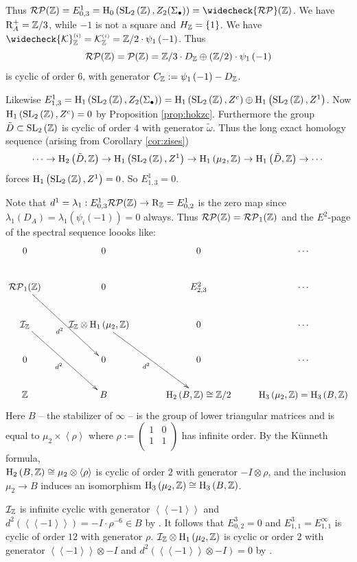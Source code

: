 \documentclass[12pt]{amsart}
\theoremstyle{definition}
\newcommand{\Z}{\Bbb{Z}}
\newcommand{\K}{\mathcal{K}}
\newcommand{\spl}[2]{\operatorname{SL}_{#1}\left(#2\right)}
\newcommand{\pb}[1]{\mathcal{P}(#1)}%
\newcommand{\rpb}[1]{\mathcal{RP}(#1)}%
\newcommand{\rpbker}[1]{\mathcal{RP}_1(#1)}%
\newcommand{\crpb}[1]{\widecheck{\mathcal{RP}}(#1)}
\newcommand{\suss}[2]{\psi_{#1}\left( #2\right)}
\newcommand{\ks}[2]{{\K}^{\mbox{\tiny $(#1)$}}_{#2}}
\newcommand{\cks}[2]{\widecheck{{\K}}^{\mbox{\tiny $(#1)$}}_{#2}}
\newcommand{\bconst}[1]{C_{#1}}
\newcommand{\cconst}[1]{D_{#1}}
\newcommand{\<}{\langle}
\renewcommand{\>}{\rangle}
\newcommand{\sgr}[1]{\mathrm{R}_{#1}}%
\newcommand{\qsgr}[1]{\mathrm{R}^{+}_{#1}} %
\newcommand{\an}[1]{\left\langle{#1}\right\rangle}
\newcommand{\pf}[1]{\left\langle\!\left\langle{#1}\right\rangle\!\right\rangle}
\newcommand{\aug}[1]{\mathcal{I}_{#1}}
\newcommand{\ho}[3]{\mathrm{H}_{#1}\left( #2,#3 \right)}
\begin{document}
Thus $\rpb{\Z}=E^1_{0,3}=\ho{0}{\spl{2}{\Z}}{Z_2(\Sigma_\bullet)}=\crpb{\Z}$. We have $\qsgr{A}=\Z/3$, while $-1$ is not a square and $H_\Z=\{ 1\}$. 
We have $\cks{i}{\Z}=\ks{i}{\Z}=\Z/2\cdot \suss{1}{-1}$. Thus 
\[
\rpb{\Z}=\pb{\Z}=\Z/3\cdot\cconst{\Z}\oplus(\Z/2)\cdot\suss{1}{-1}
\]
 is cyclic of order $6$, with generator $\bconst{\Z}:=\suss{1}{-1}-\cconst{\Z}$.

Likewise $E^1_{1,3}=\ho{1}{\spl{2}{\Z}}{Z_2(\Sigma_\bullet)}=\ho{1}{\spl{2}{\Z}}{Z^c}\oplus\ho{1}{\spl{2}{\Z}}{Z^1}$. Now\\
 $\ho{1}{\spl{2}{\Z}}{Z^c}=0$ by  Proposition \ref{prop:hokzc}. Furthermore the group $\tilde{D}\subset\spl{2}{\Z}$ is cyclic of order $4$ with generator $\tilde{\omega}$. Thus the long exact homology sequence (arising from Corollary \ref{cor:zises})
\[
\cdots \to\ho{2}{\tilde{D}}{\Z}\to \ho{1}{\spl{2}{\Z}}{Z^1}\to\ho{1}{\mu_2}{\Z}\to\ho{1}{\tilde{D}}{\Z}\to\cdots 
\]
forces $\ho{1}{\spl{2}{\Z}}{Z^1}=0$. So $E^1_{1,3}=0$.

Note that  $d^1=\lambda_1:E^1_{0,3}\rpb{\Z}\to\sgr{\Z}=E^1_{0,2}$  is the zero map since $\lambda_1(\cconst{A})=\lambda_1(\suss{i}{-1})=0$ always. Thus $\rpb{\Z}=\rpbker{\Z}$ and the $E^2$-page of the spectral sequence loooks like:
\[
\xymatrix{
0&0&0&\cdots\\
\rpbker{\Z}\ar_-{d^2}[rdd]&0&E^2_{2,3}&\cdots\\
\aug{\Z}\ar_-{d^2}[rdd]&\aug{\Z}\otimes\ho{1}{\mu_2}{\Z}\quad\ar_-{d^2}[rdd]&0&\cdots\\
0&0&0&\cdots\\
\Z&B&\ho{2}{B}{\Z}\cong \Z/2&\ho{3}{\mu_2}{\Z}=\ho{3}{B}{\Z}\\
}
\]
Here $B$ -- the stabilizer of $\infty$ --  is the group of lower triangular matrices and is equal to $\mu_2\times \an{\rho}$ where $\rho:=
\left(
\begin{array}{cc}
1&0\\
1&1\\
\end{array}
\right)$ has infinite order. By the K\"unneth formula,\\
 $\ho{2}{B}{\Z}\cong\mu_2\otimes\an{\rho}$ is cyclic of order $2$ with generator $-I\otimes\rho$, and the inclusion 
$\mu_2\to B$ induces an isomorphism $\ho{3}{\mu_2}{\Z}\cong\ho{3}{B}{\Z}$.

$\aug{\Z}$ is infinite cyclic with generator $\pf{-1}$ and $d^2(\pf{-1})=-I\cdot \rho^{-6}\in B$ by \cite[Lemma A.6]{hut:bloch1}. It follows that $E^3_{0,2}=0$ and $E^3_{1,1}=E^\infty_{1,1}$ is cyclic of order $12$ with generator $\rho$. $\aug{\Z}\otimes\ho{1}{\mu_2}{\Z}$ is cyclic or order $2$ with generator $\pf{-1}\otimes -I$ and 
$d^2(\pf{-1}\otimes -I)=0$ by \cite[Corollary A.9]{hut:bloch1}. 
\end{document}
